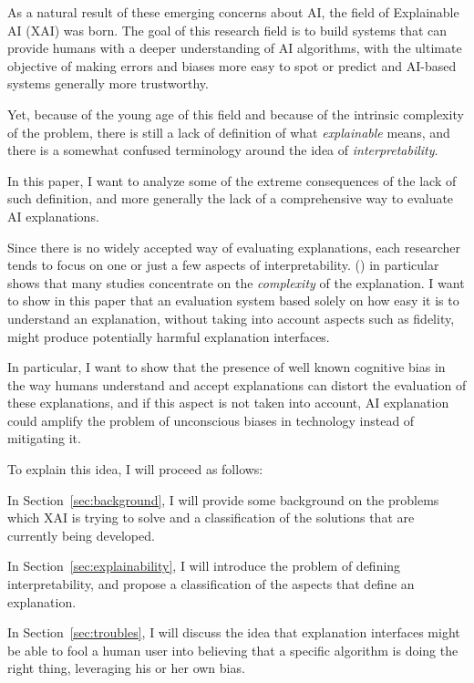 \documentclass[conference]{IEEEtran}
\begin{document}
As a natural result of these emerging concerns about AI, the field of
Explainable AI (XAI) was born. The goal of this research field is to build
systems that can provide humans with a deeper understanding of AI algorithms,
with the ultimate objective of making errors and biases more easy to spot or
predict and AI-based systems generally more trustworthy.

Yet, because of the young age of this field and because of the intrinsic
complexity of the problem, there is still a lack of definition of what
\textit{explainable} means, and there is a somewhat confused terminology around
the idea of \textit{interpretability}.

In this paper, I want to analyze some of the extreme consequences of the lack of
such definition, and more generally the lack of a comprehensive way to evaluate
AI explanations.

Since there is no widely accepted way of evaluating explanations, each
researcher tends to focus on one or just a few aspects of interpretability.
(\cite{Giannotti}) in particular shows that many studies concentrate on the
\textit{complexity} of the explanation. I want to show in this paper that an
evaluation system based solely on how easy it is to understand an explanation,
without taking into account aspects such as fidelity, might produce potentially
harmful explanation interfaces.

In particular, I want to show that the presence of well known cognitive bias in
the way humans understand and accept explanations can distort the evaluation of
these explanations, and if this aspect is not taken into account, AI explanation
could amplify the problem of unconscious biases in technology instead of
mitigating it.

To explain this idea, I will proceed as follows:

In Section~\ref{sec:background}, I will provide some background on the problems
which XAI is trying to solve and a classification of the solutions that are
currently being developed.

In Section~\ref{sec:explainability}, I will introduce the problem of defining
interpretability, and propose a classification of the aspects that define an
explanation.

In Section~\ref{sec:troubles}, I will discuss the idea that explanation
interfaces might be able to fool a human user into believing that a specific
algorithm is doing the right thing, leveraging his or her own bias.
\end{document}
